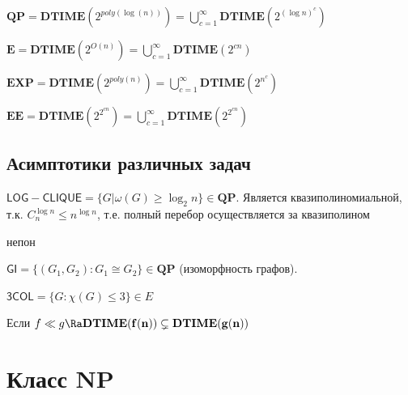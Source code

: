 \begin{definition}
    \(\mathbf{QP} = \mathbf{DTIME}(2^{poly(\log(n))}) = \bigcup_{c = 1}^\infty \mathbf{DTIME}(2^{(\log n)^c})\)
\end{definition}

\begin{definition}
    \(\mathbf{E} = \mathbf{DTIME}(2^{O(n)}) = \bigcup_{c = 1}^\infty \mathbf{DTIME}(2^{cn})\)
\end{definition}

\begin{definition}
    \(\mathbf{EXP} = \mathbf{DTIME}(2^{poly(n)}) = \bigcup_{c = 1}^\infty \mathbf{DTIME}(2^{n^c})\)
\end{definition}

\begin{definition}
    \(\mathbf{EE} = \mathbf{DTIME}(2^{2^{cn}}) = \bigcup_{c = 1}^\infty \mathbf{DTIME}(2^{2^{cn}})\)
\end{definition}

\subsection{Асимптотики различных задач}

\begin{example}
    \(\mathsf{LOG-CLIQUE} = \{G | \omega(G) \ge \log_2 n\} \in \mathbf{QP}\). Является квазиполиномиальной, т.к. \(C_n^{\log n} \le n^{\log n}\), т.е. полный перебор осуществляется за квазиполином
\end{example}

\begin{example}
    непон
\end{example}

\begin{example}
    \(\mathsf{GI} = \{(G_1, G_2): G_1 \cong G_2\} \in \mathbf{QP}\) (изоморфность графов).
\end{example}

\begin{example}
    \(\mathsf{3COL} = \{G: \chi(G) \le 3\} \in E\)
\end{example}

\begin{theorem}
    Если \(f \ll g \Ra \mathbf{DTIME(f(n))} \subsetneq \mathbf{DTIME(g(n))}\)
\end{theorem}


\section{Класс \(\mathbf{NP}\)}

